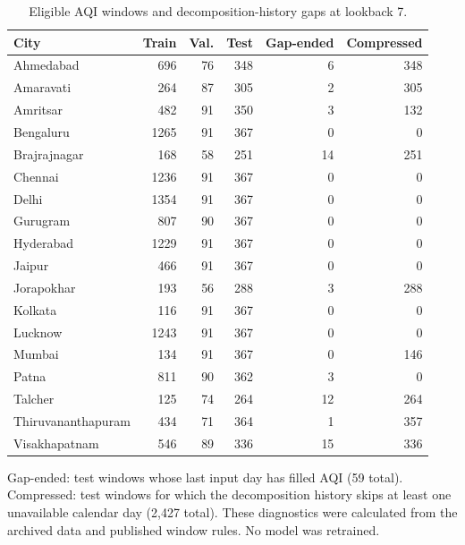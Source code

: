 \begin{table}[!htbp]
\centering
\caption{Eligible AQI windows and decomposition-history gaps at lookback 7.}\label{tab:windows}
\setlength{\tabcolsep}{4pt}
\begin{tabular}{lrrrrr}
\toprule
City & Train & Val. & Test & Gap-ended & Compressed \\
\midrule
Ahmedabad & 696 & 76 & 348 & 6 & 348 \\
Amaravati & 264 & 87 & 305 & 2 & 305 \\
Amritsar & 482 & 91 & 350 & 3 & 132 \\
Bengaluru & 1265 & 91 & 367 & 0 & 0 \\
Brajrajnagar & 168 & 58 & 251 & 14 & 251 \\
Chennai & 1236 & 91 & 367 & 0 & 0 \\
Delhi & 1354 & 91 & 367 & 0 & 0 \\
Gurugram & 807 & 90 & 367 & 0 & 0 \\
Hyderabad & 1229 & 91 & 367 & 0 & 0 \\
Jaipur & 466 & 91 & 367 & 0 & 0 \\
Jorapokhar & 193 & 56 & 288 & 3 & 288 \\
Kolkata & 116 & 91 & 367 & 0 & 0 \\
Lucknow & 1243 & 91 & 367 & 0 & 0 \\
Mumbai & 134 & 91 & 367 & 0 & 146 \\
Patna & 811 & 90 & 362 & 3 & 0 \\
Talcher & 125 & 74 & 264 & 12 & 264 \\
Thiruvananthapuram & 434 & 71 & 364 & 1 & 357 \\
Visakhapatnam & 546 & 89 & 336 & 15 & 336 \\
\bottomrule
\end{tabular}
\par\smallskip\begin{minipage}{0.98\linewidth}\footnotesize Gap-ended: test windows whose last input day has filled AQI (59 total). Compressed: test windows for which the decomposition history skips at least one unavailable calendar day (2,427 total). These diagnostics were calculated from the archived data and published window rules. No model was retrained.\end{minipage}
\end{table}
